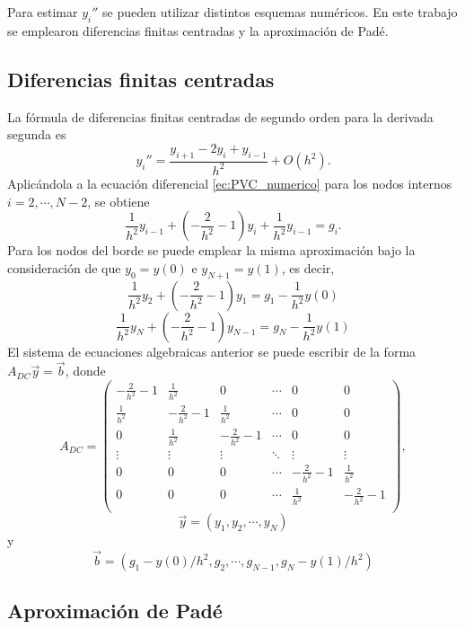 \documentclass[aps,prb,twocolumn,superscriptaddress,floatfix,longbibliography]{revtex4-2}
\newif\ifptitle
\newif\ifpnumber
\newcounter{para}
\newcommand\ptitle[1]{\par\refstepcounter{para}
{\ifpnumber{\noindent\textcolor{lightgray}{\textbf{\thepara}}\indent}\fi}
{\ifptitle{\textbf{[{#1}]}}\fi}}
\begin{document}
\ptitle{Para estimar y'' emplearon diferencias finitas centradas de segundo orden y el \textcolor{red}{esquema} de Padé \textcolor{red}{de 4to orden}}
Para estimar $y_i''$ se pueden utilizar distintos esquemas numéricos. En este trabajo se emplearon diferencias finitas centradas y la aproximación de Padé.


\subsection{Diferencias finitas centradas}
La fórmula de diferencias finitas centradas de segundo orden para la derivada segunda es \cite{Moin}
\begin{equation}
    y_i'' = \frac{y_{i+1} - 2 y_i + y_{i-1}}{h^2} + O(h^2).
    \label{ec:diferencias_centradas}
\end{equation}
Aplicándola a la ecuación diferencial \ref{ec:PVC_numerico} para los nodos internos $i = 2, \cdots, N-2$, se obtiene
\[ \frac{1}{h^2} y_{i-1} + \left (-\frac{2}{h^2} - 1 \right ) y_i + \frac{1}{h^2} y_{i-1} = g_i.\]
Para los nodos del borde se puede emplear la misma aproximación bajo la consideración de que $y_0 = y(0)$ e $y_{N+1} = y(1)$, es decir,
\[\frac{1}{h^2}y_2 + \left (-\frac{2}{h^2} - 1 \right ) y_1 = g_1 - \frac{1}{h^2}y(0)  \]
\[\frac{1}{h^2}y_N + \left (-\frac{2}{h^2} - 1 \right ) y_{N-1} = g_N - \frac{1}{h^2}y(1)  \]
El sistema de ecuaciones algebraicas anterior se puede escribir de la forma $A_{DC} \vec{y} = \vec{b}$, donde
\[
    A_{DC} = \left(\begin{matrix}
        -\frac{2}{h^2} - 1 & \frac{1}{h^2} & 0 & \cdots & 0 & 0\\
        \frac{1}{h^2} & -\frac{2}{h^2} - 1 & \frac{1}{h^2} & \cdots & 0 & 0\\
        0 & \frac{1}{h^2} & -\frac{2}{h^2} - 1 & \cdots & 0 & 0\\
        \vdots & \vdots & \vdots & \ddots & \vdots & \vdots\\
        0 & 0 & 0 & \cdots & -\frac{2}{h^2} - 1 & \frac{1}{h^2}\\
        0 & 0 & 0 & \cdots & \frac{1}{h^2} & -\frac{2}{h^2} - 1\\
        \end{matrix}\right),
\]
\[\vec{y} = (y_1, y_2, \cdots, y_N)\]
y
\[\vec{b} = (g_1 - y(0)/h^2, g_2, \cdots, g_{N-1}, g_N -  y(1)/h^2)\]


\subsection{Aproximación de Padé}
\end{document}
